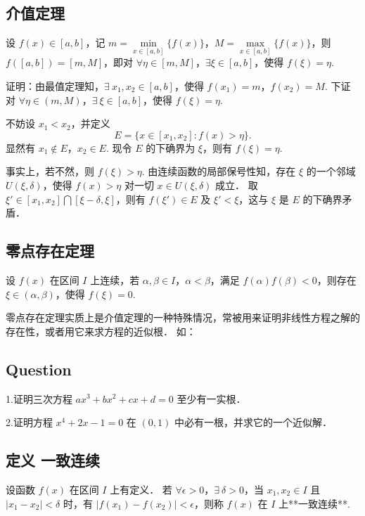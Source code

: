 \subsection{介值定理}

  设 $f(x)\in [a,b]$，记 $m=\min\limits_{x\in[a,b]}\{f(x)\}$，$M=\max\limits_{x\in[a,b]}\{f(x)\}$，则 $f([a,b])=[m,M]$，即对 $\forall \eta\in[m,M]$，$\exists \xi\in[a,b]$，使得 $f(\xi)=\eta$.

  证明：由最值定理知，$\exists\ x_1,x_2\in[a,b]$，使得 $f(x_1)=m$，$f(x_2)=M$. 下证对 $\forall \eta\in (m,M)$，$\exists\  \xi\in[a,b]$，使得 $f(\xi)=\eta$.

  不妨设 $x_1<x_2$，并定义
  $$
  E=\{x\in[x_1,x_2]:f(x)>\eta\}.
  $$
  显然有 $x_1\notin E$，$x_2\in E$. 现令 $E$ 的下确界为 $\xi$，则有 $f(\xi)=\eta$.

  事实上，若不然，则 $f(\xi)>\eta$. 由连续函数的局部保号性知，存在 $\xi$ 的一个邻域 $U(\xi,\delta)$，使得 $f(x)>\eta$ 对一切 $x\in U(\xi,\delta)$ 成立． 取 $\xi'\in[x_1,x_2]\bigcap [\xi-\delta,\xi]$，则有 $f(\xi')\in E$ 及 $\xi'<\xi$，这与 $\xi$ 是 $E$ 的下确界矛盾．

\subsection{零点存在定理}

  设 $f(x)$ 在区间 $I$ 上连续，若 $\alpha,\beta\in I$，$\alpha<\beta$，满足 $f(\alpha)f(\beta)<0$，则存在 $\xi\in(\alpha,\beta)$，使得 $f(\xi)=0$.

  零点存在定理实质上是介值定理的一种特殊情况，常被用来证明非线性方程之解的存在性，或者用它来求方程的近似根． 如：

\subsection{Question}

  1.证明三次方程 $ax^3+bx^2+cx+d=0$ 至少有一实根．

  2.证明方程 $x^4+2x-1=0$ 在 $(0,1)$ 中必有一根，并求它的一个近似解．

\subsection{定义  一致连续}

  设函数 $f(x)$ 在区间 $I$ 上有定义．  若 $\forall \epsilon>0$，$\exists\ \delta>0$，当 $x_1,x_2\in I$ 且 $\vert x_1-x_2\vert<\delta$ 时，有 $\vert f(x_1)-f(x_2)\vert<\epsilon$，则称 $f(x)$ 在 $I$ 上**一致连续**. 

